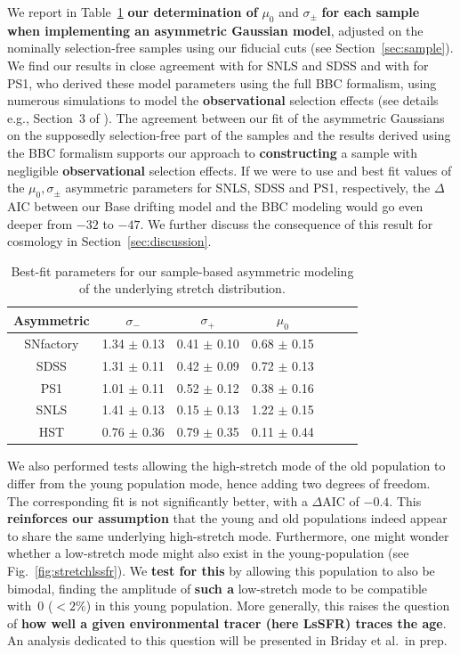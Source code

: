 \documentclass[]{aa}
\begin{document}
We report in Table~\ref{tab:bbc} \textbf{our determination of} $\mu_0$ and
$\sigma_{\pm}$ \textbf{for each sample when implementing an asymmetric Gaussian
model}, adjusted on the nominally selection-free samples using our fiducial cuts
(see Section~\ref{sec:sample}). We find our results in close agreement with
\cite{scolnic2016} for SNLS and SDSS and with \cite{scolnic2018a} for PS1, who
derived these model parameters using the full BBC formalism, using numerous
simulations to model the \textbf{observational} selection effects (see details
e.g., Section~3 of \citealt{kessler2017}). The agreement between our fit of the
asymmetric Gaussians on the supposedly selection-free part of the samples and
the results derived using the BBC formalism supports our approach to
\textbf{constructing} a sample with negligible \textbf{observational} selection
effects. If we were to use \cite{scolnic2016} and \cite{scolnic2018a} best fit
values of the $\mu_0, \sigma_{\pm}$ asymmetric parameters for SNLS, SDSS and
PS1, respectively, the $\Delta$AIC between our Base drifting model and the BBC
modeling would go even deeper from $-32$ to $-47$. We further discuss the
consequence of this result for cosmology in Section~\ref{sec:discussion}.
    
\begin{table}
    \centering
    \caption{Best-fit parameters for our sample-based asymmetric modeling of the
    underlying stretch distribution.}
    \label{tab:bbc}
    \begin{tabular}{ccccccc}
    \hline\hline
    Asymmetric & $\sigma_{-}$ & $\sigma_{+}$ & $\mu_0$ \\
    \hline
    SNfactory & 1.34 $\pm$ 0.13 & 0.41 $\pm$ 0.10 & 0.68 $\pm$ 0.15 \\
    SDSS & 1.31 $\pm$ 0.11 & 0.42 $\pm$ 0.09 & 0.72 $\pm$ 0.13 \\
    PS1 & 1.01 $\pm$ 0.11 & 0.52 $\pm$ 0.12 & 0.38 $\pm$ 0.16 \\
    SNLS & 1.41 $\pm$ 0.13 & 0.15 $\pm$ 0.13 & 1.22 $\pm$ 0.15 \\
    HST & 0.76 $\pm$ 0.36 & 0.79 $\pm$ 0.35 & 0.11 $\pm$ 0.44 \\
    \hline
    \end{tabular}
\end{table}
    
We also performed tests allowing the high-stretch mode of the old population to
differ from the young population mode, hence adding two degrees of freedom. The
corresponding fit is not significantly better, with a $\Delta$AIC of $-0.4$.
This \textbf{reinforces our assumption} that the young and old populations
indeed appear to share the same underlying high-stretch mode. Furthermore, one
might wonder whether a low-stretch mode might also exist in the young-population
(see Fig.~\ref{fig:stretchlssfr}). We \textbf{test for this} by allowing this
population to also be bimodal, finding the amplitude of \textbf{such a}
low-stretch mode to be compatible with~0 ($<2\%$) in this young population. More
generally, this raises the question of \textbf{how well a given environmental
tracer (here LsSFR) traces the age}. An analysis dedicated to this question will
be presented in Briday et al.\ in prep.
\end{document}

